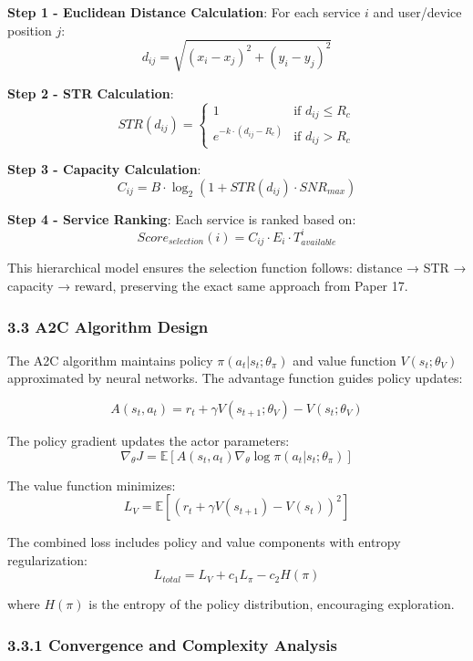 \documentclass[
  10pt,
  twocolumn,
]{article}
\begin{document}
\textbf{Step 1 - Euclidean Distance Calculation}: For each service \(i\)
and user/device position \(j\):
\[d_{ij} = \sqrt{(x_i - x_j)^2 + (y_i - y_j)^2}\]

\textbf{Step 2 - STR Calculation}:
\[STR(d_{ij}) = \begin{cases} 1 & \text{if } d_{ij} \leq R_c \\ e^{-k \cdot (d_{ij} - R_c)} & \text{if } d_{ij} > R_c \end{cases}\]

\textbf{Step 3 - Capacity Calculation}:
\[C_{ij} = B \cdot \log_2(1 + STR(d_{ij}) \cdot SNR_{max})\]

\textbf{Step 4 - Service Ranking}: Each service is ranked based on:
\[Score_{selection}(i) = C_{ij} \cdot E_i \cdot T_{available}^i\]

This hierarchical model ensures the selection function follows: distance
→ STR → capacity → reward, preserving the exact same approach from Paper
17.

\hypertarget{a2c-algorithm-design}{%
	\subsubsection{3.3 A2C Algorithm Design}\label{a2c-algorithm-design}}

The A2C algorithm maintains policy \(\pi(a_t|s_t; \theta_\pi)\) and
value function \(V(s_t; \theta_V)\) approximated by neural networks. The
advantage function guides policy updates:

\[A(s_t, a_t) = r_t + \gamma V(s_{t+1}; \theta_V) - V(s_t; \theta_V)\]

The policy gradient updates the actor parameters:
\[\nabla_\theta J = \mathbb{E}[A(s_t, a_t) \nabla_\theta \log \pi(a_t|s_t; \theta_\pi)]\]

The value function minimizes:
\[L_V = \mathbb{E}[(r_t + \gamma V(s_{t+1}) - V(s_t))^2]\]

The combined loss includes policy and value components with entropy
regularization: \[L_{total} = L_V + c_1 L_\pi - c_2 H(\pi)\]

where \(H(\pi)\) is the entropy of the policy distribution, encouraging
exploration.

\hypertarget{convergence-and-complexity-analysis}{%
	\subsubsection{3.3.1 Convergence and Complexity
		Analysis}\label{convergence-and-complexity-analysis}}
\end{document}
